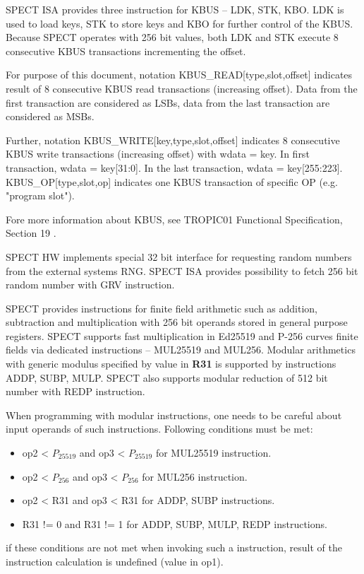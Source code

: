 \documentclass{tropic_design_spec}
\begin{document}
SPECT ISA provides three instruction for KBUS -- LDK, STK, KBO. LDK is used to load keys, STK to store keys
and KBO for further control of the KBUS. Because SPECT operates with 256 bit values, both LDK and STK execute 8
consecutive KBUS transactions incrementing the offset.

For purpose of this document, notation KBUS_READ[type,slot,offset] indicates result of 8 consecutive
KBUS read transactions (increasing offset). Data from the first transaction are considered as LSBs,
data from the last transaction are considered as MSBs.

Further, notation KBUS_WRITE[key,type,slot,offset] indicates 8 consecutive KBUS write transactions (increasing offset)
with wdata = key. In first transaction, wdata = key[31:0]. In the last transaction, wdata = key[255:223].
KBUS_OP[type,slot,op] indicates one KBUS transaction of specific OP (e.g. "program slot").

Fore more information about KBUS, see TROPIC01 Functional Specification, Section 19 \cite{TROPIC01}.


SPECT HW implements special 32 bit interface for requesting random numbers from the external systems RNG.
SPECT ISA provides possibility to fetch 256 bit random number with GRV instruction.


SPECT provides instructions for finite field arithmetic such as
addition, subtraction and multiplication with 256 bit operands stored in general purpose
registers. SPECT supports fast multiplication in Ed25519 and P-256 curves finite fields 
via dedicated instructions -- MUL25519 and MUL256. Modular arithmetics with generic modulus
specified by value in \textbf{R31} is supported by instructions ADDP, SUBP, MULP. SPECT
also supports modular reduction of 512 bit number with REDP instruction.

When programming with modular instructions, one needs to be careful about input
operands of such instructions. Following conditions must be met:
\begin{itemize}
    \item op2 < $P_{25519}$ and op3 < $P_{25519}$ for MUL25519 instruction.
    \item op2 < $P_{256}$ and op3 < $P_{256}$ for MUL256 instruction.
    \item op2 < R31 and op3 < R31 for ADDP, SUBP instructions.
    \item R31 != 0 and R31 != 1 for ADDP, SUBP, MULP, REDP instructions.
\end{itemize}
if these conditions are not met when invoking such a instruction, result
of the instruction calculation is undefined (value in op1).
\end{document}
